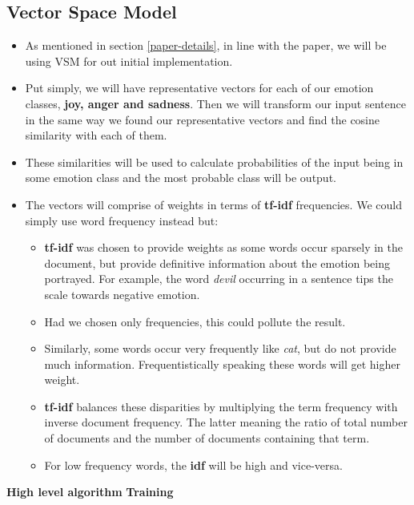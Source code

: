 \subsection{Vector Space Model}
\begin{itemize}
\item As mentioned in section \ref{paper-details}, in line with the paper, we will be using VSM for out initial implementation.
\item Put simply, we will have representative vectors for each of our emotion classes, \textbf{joy, anger and sadness}. Then we will transform our input sentence in the same way we found our representative vectors and find the cosine similarity with each of them.
\item These similarities will be used to calculate probabilities of the input being in some emotion class and the most probable class will be output.
\item The vectors will comprise of weights in terms of \textbf{tf-idf} frequencies. We could simply use word frequency instead but:
	\begin{itemize}
		\item \textbf{tf-idf} was chosen to provide weights as some words occur sparsely in the document, but provide definitive information about the emotion being portrayed. For example, the word \emph{devil} occurring in a sentence tips the scale towards negative emotion.
		\item Had we chosen only frequencies, this could pollute the result.
		\item Similarly, some words occur very frequently like \emph{cat}, but do not provide much information. Frequentistically speaking these words will get higher weight.
		\item \textbf{tf-idf} balances these disparities by multiplying the term frequency with inverse document frequency. The latter meaning the ratio of total number of documents and the number of documents containing that term.
		\item For low frequency words, the \textbf{idf} will be high and vice-versa.
	\end{itemize}
\end{itemize}
\textbf{High level algorithm}
\label{subsec-high-level-alg}
\textbf{Training}
